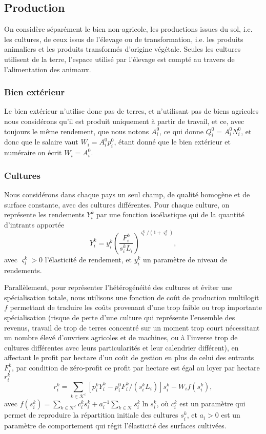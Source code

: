 \subsection{Production}
On considère séparément le bien non-agricole, les productions issues du sol, i.e. les cultures, de ceux issus de l’élevage ou de transformation, i.e. les produits animaliers et les produits transformés d’origine végétale. Seules les cultures utilisent de la terre, l’espace utilisé par l’élevage est compté au travers de l’alimentation des animaux.

\subsubsection{Bien extérieur}
Le bien extérieur n’utilise donc pas de terres, et n’utilisant pas de biens agricoles nous considérons qu’il est produit uniquement à partir de travail, et ce, avec toujours le même rendement, que nous notons $A_i^0$, ce qui donne $Q_i^0 = A_i^0 N_i^0$, et donc que le salaire vaut $W_i = A_i^0 p_i^0$, étant donné que le bien extérieur et numéraire on écrit $W_i=A_i^0$.

\subsubsection{Cultures}

Nous considérons dans chaque pays un seul champ, de qualité homogène et de surface constante, avec des cultures différentes. Pour chaque culture, on représente les rendements $Y_i^k$ par une fonction isoélastique qui de la quantité d’intrants apportée
\begin{equation}\label{eq_yik}
    Y_i^k = y_i^k \left( \frac{F_i^k}{s_i^k L_i} \right) ^{\varsigma_i^k/(1+\varsigma_i^k)},
\end{equation}
avec $\varsigma_i^k > 0$ l’élasticité de rendement, et $y_i^k$ un paramètre de niveau de rendements.

Parallèlement, pour représenter l’hétérogénéité des cultures et éviter une spécialisation totale, nous utilisons une fonction de coût de production multilogit $f$ permettant de traduire les coûts provenant d’une trop faible ou trop importante spécialisation (risque de perte d’une culture qui représente l’ensemble des revenus, travail de trop de terres concentré sur un moment trop court nécessitant un nombre élevé d’ouvriers agricoles et de machines, ou à l’inverse trop de cultures différentes avec leurs particularités et leur calendrier différent), en affectant le profit par hectare d’un coût de gestion en plus de celui des entrants $F_i^k$, par condition de zéro-profit ce profit par hectare est égal au loyer par hectare $r_i^k$
\begin{equation}\label{eq_rik}
    r_i^k = \sum_{k \in \mathcal{K}^c} [p_i^k Y_i^k - p_i^0 F_i^k/(s_i^k L_i)]s_i^k - W_i f(s_i^k),
\end{equation}
avec $f(s_i^k) = \sum_{k \in \mathcal{K}^c} c_i^k s_i^k + a_i^{-1} \sum_{k \in \mathcal{K}} s_i^k \ln s_i^k$, où $c_i^k$ est un paramètre qui permet de reproduire la répartition initiale des cultures $s_i^k$, et $a_i > 0$ est un paramètre de comportement qui régit l’élasticité des surfaces cultivées.

